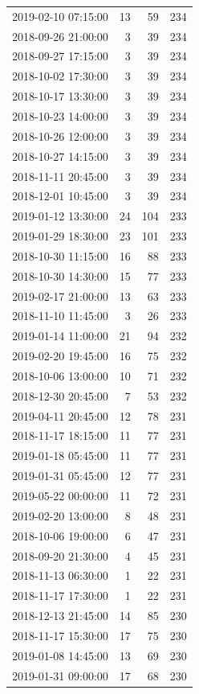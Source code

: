 \begin{tabular}{lrrr}
2019-02-10 07:15:00 & 13 & 59 & 234 \\
2018-09-26 21:00:00 & 3 & 39 & 234 \\
2018-09-27 17:15:00 & 3 & 39 & 234 \\
2018-10-02 17:30:00 & 3 & 39 & 234 \\
2018-10-17 13:30:00 & 3 & 39 & 234 \\
2018-10-23 14:00:00 & 3 & 39 & 234 \\
2018-10-26 12:00:00 & 3 & 39 & 234 \\
2018-10-27 14:15:00 & 3 & 39 & 234 \\
2018-11-11 20:45:00 & 3 & 39 & 234 \\
2018-12-01 10:45:00 & 3 & 39 & 234 \\
2019-01-12 13:30:00 & 24 & 104 & 233 \\
2019-01-29 18:30:00 & 23 & 101 & 233 \\
2018-10-30 11:15:00 & 16 & 88 & 233 \\
2018-10-30 14:30:00 & 15 & 77 & 233 \\
2019-02-17 21:00:00 & 13 & 63 & 233 \\
2018-11-10 11:45:00 & 3 & 26 & 233 \\
2019-01-14 11:00:00 & 21 & 94 & 232 \\
2019-02-20 19:45:00 & 16 & 75 & 232 \\
2018-10-06 13:00:00 & 10 & 71 & 232 \\
2018-12-30 20:45:00 & 7 & 53 & 232 \\
2019-04-11 20:45:00 & 12 & 78 & 231 \\
2018-11-17 18:15:00 & 11 & 77 & 231 \\
2019-01-18 05:45:00 & 11 & 77 & 231 \\
2019-01-31 05:45:00 & 12 & 77 & 231 \\
2019-05-22 00:00:00 & 11 & 72 & 231 \\
2019-02-20 13:00:00 & 8 & 48 & 231 \\
2018-10-06 19:00:00 & 6 & 47 & 231 \\
2018-09-20 21:30:00 & 4 & 45 & 231 \\
2018-11-13 06:30:00 & 1 & 22 & 231 \\
2018-11-17 17:30:00 & 1 & 22 & 231 \\
2018-12-13 21:45:00 & 14 & 85 & 230 \\
2018-11-17 15:30:00 & 17 & 75 & 230 \\
2019-01-08 14:45:00 & 13 & 69 & 230 \\
2019-01-31 09:00:00 & 17 & 68 & 230 \\

\end{tabular}
